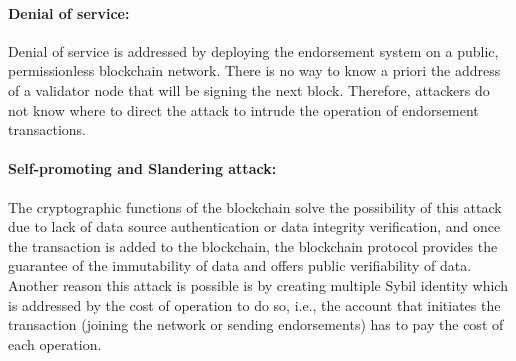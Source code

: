 \paragraph{Denial of service:} Denial of service is addressed by deploying the
endorsement system on a public, permissionless blockchain network. There is no
way to know a priori the address of a validator node that will be signing the
next block. Therefore, attackers do not know where to direct the attack to
intrude the operation of endorsement transactions. 
\paragraph{Self-promoting and Slandering attack:}The cryptographic functions of
the blockchain solve the possibility of this attack due to lack of data source
authentication or data integrity verification, and once the transaction is
added to the blockchain, the blockchain protocol provides the guarantee of the
immutability of data and offers public verifiability of data.  Another reason
this attack is possible is by creating multiple Sybil identity which is
addressed by the cost of operation to do so, i.e., the account that initiates
the transaction (joining the network or sending endorsements) has to pay the
cost of each operation.
